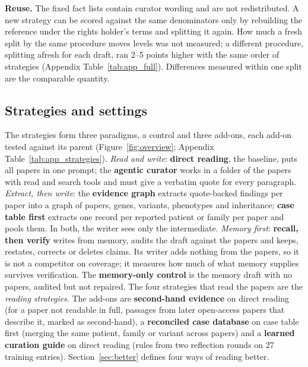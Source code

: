 \documentclass{article} %
\begin{document}
\textbf{Reuse.} The fixed fact lists contain curator wording and are not redistributed. A new strategy can be scored against the same denominators only by rebuilding the reference under the rights holder's terms and splitting it again. How much a fresh split by the same procedure moves levels was not measured; a different procedure, splitting afresh for each draft, ran 2--5 points higher with the same order of strategies (Appendix Table~\ref{tab:app_full}). Differences measured within one split are the comparable quantity.

\subsection{Strategies and settings}
\label{sec:strategies}
The strategies form three paradigms, a control and three add-ons, each add-on tested against its parent (Figure~\ref{fig:overview}; Appendix Table~\ref{tab:app_strategies}). \emph{Read and write}: \textbf{direct reading}, the baseline, puts all papers in one prompt; the \textbf{agentic curator} works in a folder of the papers with read and search tools and must give a verbatim quote for every paragraph. \emph{Extract, then write}: the \textbf{evidence graph} extracts quote-backed findings per paper into a graph of papers, genes, variants, phenotypes and inheritance; \textbf{case table first} extracts one record per reported patient or family per paper and pools them. In both, the writer sees only the intermediate. \emph{Memory first}: \textbf{recall, then verify} writes from memory, audits the draft against the papers and keeps, restates, corrects or deletes claims. Its writer adds nothing from the papers, so it is not a competitor on coverage; it measures how much of what memory supplies survives verification. The \textbf{memory-only control} is the memory draft with no papers, audited but not repaired. The four strategies that read the papers are the \emph{reading strategies}. The add-ons are \textbf{second-hand evidence} on direct reading (for a paper not readable in full, passages from later open-access papers that describe it, marked as second-hand), a \textbf{reconciled case database} on case table first (merging the same patient, family or variant across papers) and a \textbf{learned curation guide} on direct reading (rules from two reflection rounds on 27 training entries). Section~\ref{sec:better} defines four ways of reading better.
\end{document}
